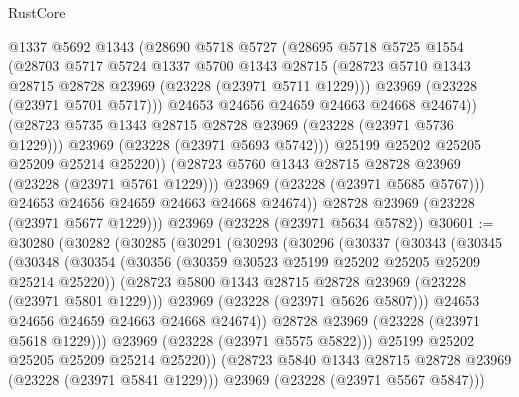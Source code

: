\begin{lexlean}{RustCore}
\begin{coremodule}
                  @1337
                  @5692
                  @1343
                  (@28690
                    @5718
                    @5727
                    (@28695
                      @5718
                      @5725
                      @1554
                      (@28703
                        @5717
                        @5724
                        @1337
                        @5700
                        @1343
                        @28715
                        (@28723 @5710 @1343 @28715 @28728 @23969 (@23228 (@23971 @5711 @1229)))
                        @23969
                        (@23228 (@23971 @5701 @5717)))
                      @24653
                      @24656
                      @24659
                      @24663
                      @24668
                      @24674))
                  (@28723 @5735 @1343 @28715 @28728 @23969 (@23228 (@23971 @5736 @1229)))
                  @23969
                  (@23228 (@23971 @5693 @5742)))
                @25199
                @25202
                @25205
                @25209
                @25214
                @25220))
            (@28723 @5760 @1343 @28715 @28728 @23969 (@23228 (@23971 @5761 @1229)))
            @23969
            (@23228 (@23971 @5685 @5767)))
          @24653
          @24656
          @24659
          @24663
          @24668
          @24674))
      @28728
      @23969
      (@23228 (@23971 @5677 @1229)))
    @23969
    (@23228 (@23971 @5634 @5782))
@30601 := @30280
    (@30282
      (@30285
        (@30291
          (@30293
            (@30296
              (@30337
                (@30343
                  (@30345
                    (@30348
                      (@30354
                        (@30356 (@30359 @30523 @25199 @25202 @25205 @25209 @25214 @25220))
                        (@28723 @5800 @1343 @28715 @28728 @23969 (@23228 (@23971 @5801 @1229)))
                        @23969
                        (@23228 (@23971 @5626 @5807)))
                      @24653
                      @24656
                      @24659
                      @24663
                      @24668
                      @24674))
                  @28728
                  @23969
                  (@23228 (@23971 @5618 @1229)))
                @23969
                (@23228 (@23971 @5575 @5822)))
              @25199
              @25202
              @25205
              @25209
              @25214
              @25220))
          (@28723 @5840 @1343 @28715 @28728 @23969 (@23228 (@23971 @5841 @1229)))
          @23969
          (@23228 (@23971 @5567 @5847)))

\end{coremodule}
\end{lexlean}
